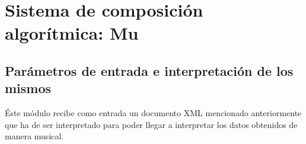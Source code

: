 \section{Sistema de composición algorítmica: Mu}


\subsection{Parámetros de entrada e interpretación de los mismos}

Éste módulo recibe como entrada un documento XML mencionado anteriormente  que ha de ser interpretado para poder llegar a interpretar los datos obtenidos de manera musical.